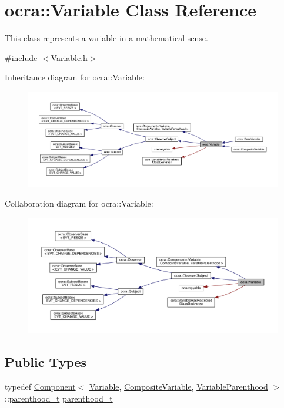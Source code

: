 \hypertarget{classocra_1_1Variable}{}\section{ocra\+:\+:Variable Class Reference}
\label{classocra_1_1Variable}


This class represents a variable in a mathematical sense.  




{\ttfamily \#include $<$Variable.\+h$>$}



Inheritance diagram for ocra\+:\+:Variable\+:\nopagebreak
\begin{figure}[H]
\begin{center}
\leavevmode
\includegraphics[width=350pt]{de/d84/classocra_1_1Variable__inherit__graph}
\end{center}
\end{figure}


Collaboration diagram for ocra\+:\+:Variable\+:\nopagebreak
\begin{figure}[H]
\begin{center}
\leavevmode
\includegraphics[width=350pt]{d5/d92/classocra_1_1Variable__coll__graph}
\end{center}
\end{figure}
\subsection*{Public Types}
\begin{DoxyCompactItemize}
\item 
typedef \hyperlink{classocra_1_1Component}{Component}$<$ \hyperlink{classocra_1_1Variable}{Variable}, \hyperlink{classocra_1_1CompositeVariable}{Composite\+Variable}, \hyperlink{structocra_1_1VariableParenthood}{Variable\+Parenthood} $>$\+::\hyperlink{classocra_1_1Variable_a88444b2124cf5aab069f46734822f31f}{parenthood\+\_\+t} \hyperlink{classocra_1_1Variable_a88444b2124cf5aab069f46734822f31f}{parenthood\+\_\+t}
\end{DoxyCompactItemize}
